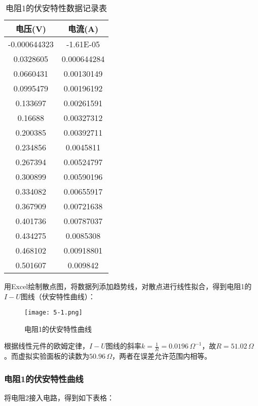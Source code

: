 \documentclass[12pt]{article}
\begin{document}
\begin{table}[htbp]
    \centering
    \begin{tabular}{|c|c|}
    \hline
    电压(V) & 电流(A) \\
        \hline
        -0.000644323 & -1.61E-05 \\
        \hline
        0.0328605 & 0.000644284 \\
        \hline
        0.0660431 & 0.00130149 \\
        \hline
        0.0995479 & 0.00196192 \\
        \hline
        0.133697 & 0.00261591 \\
        \hline
        0.16688 & 0.00327312 \\
        \hline
        0.200385 & 0.00392711 \\
        \hline
        0.234856 & 0.0045811 \\
        \hline
        0.267394 & 0.00524797 \\
        \hline
        0.300899 & 0.00590196 \\
        \hline
        0.334082 & 0.00655917 \\
        \hline
        0.367909 & 0.00721638 \\
        \hline
        0.401736 & 0.00787037 \\
        \hline
        0.434275 & 0.0085308 \\
        \hline
        0.468102 & 0.00918801 \\
        \hline
        0.501607 & 0.009842 \\
        \hline
    \end{tabular}%
    \caption{电阻1的伏安特性数据记录表}
\end{table}%

用Excel绘制散点图，将数据列添加趋势线，对散点进行线性拟合，得到电阻1的$I-U$图线（伏安特性曲线）：

\begin{figure}[h!]
    \centering
    \texttt{[image: 5-1.png]}
    \caption{电阻1的伏安特性曲线}
\end{figure}

根据线性元件的欧姆定律，$I-U$图线的斜率$k=\frac{1}{R}=0.0196\,\Omega^{-1}$，故$R=51.02\,\Omega$。而虚拟实验面板的读数为$50.96\,\Omega$，两者在误差允许范围内相等。

\subsubsection{电阻1的伏安特性曲线}
将电阻2接入电路，得到如下表格：
\end{document}
